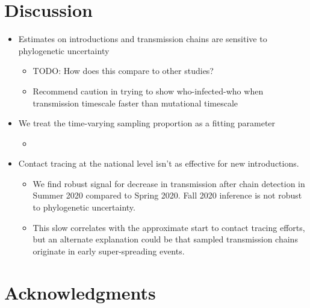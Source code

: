 \documentclass[9pt,twocolumn,twoside,lineno]{pnas-new}
\begin{document}
\section{Discussion}
\begin{itemize}
    \item Estimates on introductions and transmission chains are sensitive to phylogenetic uncertainty
    \begin{itemize}
        \item TODO: How does this compare to other studies?
        \item Recommend caution in trying to show who-infected-who when transmission timescale faster than mutational timescale
    \end{itemize}
    \item We treat the time-varying sampling proportion as a fitting parameter
    \begin{itemize}
        \item 
    \end{itemize}
    \item Contact tracing at the national level isn't as effective for new introductions.
    \begin{itemize}
        \item We find robust signal for decrease in transmission after chain detection in Summer 2020 compared to Spring 2020. Fall 2020 inference is not robust to phylogenetic uncertainty. 
        \item This slow correlates with the approximate start to contact tracing efforts, but an alternate explanation could be that sampled transmission chains originate in early super-spreading events.
    \end{itemize}
\end{itemize}

\section{Acknowledgments}



\end{document}
